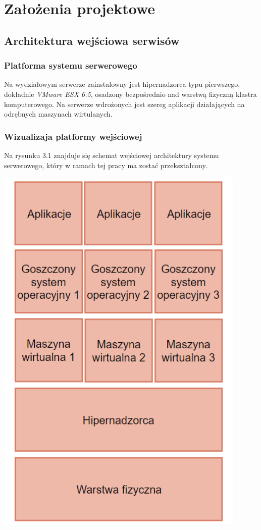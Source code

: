 \documentclass[polish, a4paper, 12pt, oneside]{book}
\begin{document}
\chapter{Założenia projektowe}
\section{Architektura wejściowa serwisów}
\subsection{Platforma systemu serwerowego}
Na wydziałowym serwerze zainstalowny jest hipernadzorca typu pierwszego, dokładnie \textit{VMware ESX 6.5}\cite{vmwareesx}, osadzony bezpośrednio nad warstwą fizyczną klastra komputerowego. Na serwerze wdrożonych jest szereg aplikacji działających na odrębnych maszynach wirtulanych. 

\subsection {Wizualizaja platformy wejściowej} Na rysunku 3.1 znajduje się schemat wejściowej architektury systemu serwerowego, który w ramach tej pracy ma zostać przekształcony.
\begin{center}
\includegraphics[width=120mm]{schemat_archwej.png}
\end{center}
\end{document}
